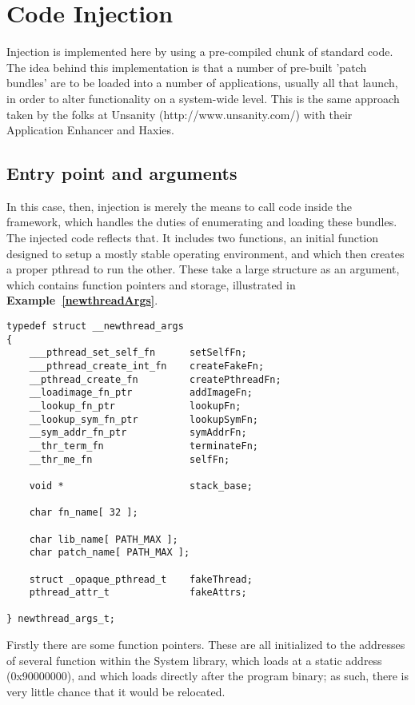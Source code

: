 \documentclass[english]{article}
\begin{document}
\section{Code Injection}

Injection is implemented here by using a pre-compiled chunk of standard code. The idea behind this implementation is that a number of pre-built 'patch bundles' are to be loaded into a number of applications, usually all that launch, in order to alter functionality on a system-wide level. This is the same approach taken by the folks at Unsanity (http://www.unsanity.com/) with their Application Enhancer and Haxies.

\subsection{Entry point and arguments}
In this case, then, injection is merely the means to call code inside the framework, which handles the duties of enumerating and loading these bundles. The injected code reflects that. It includes two functions, an initial function designed to setup a mostly stable operating environment, and which then creates a proper pthread to run the other. These take a large structure as an argument, which contains function pointers and storage, illustrated in \textbf{Example~\ref{newthreadArgs}}.

\begin{lstlisting}[label=newthreadArgs, caption=Injected code parameter block.]
typedef struct __newthread_args
{
    ___pthread_set_self_fn      setSelfFn;
    ___pthread_create_int_fn    createFakeFn;
    __pthread_create_fn         createPthreadFn;
    __loadimage_fn_ptr          addImageFn;
    __lookup_fn_ptr             lookupFn;
    __lookup_sym_fn_ptr         lookupSymFn;
    __sym_addr_fn_ptr           symAddrFn;
    __thr_term_fn               terminateFn;
    __thr_me_fn                 selfFn;

    void *                      stack_base;

    char fn_name[ 32 ];

    char lib_name[ PATH_MAX ];
    char patch_name[ PATH_MAX ];

    struct _opaque_pthread_t    fakeThread;
    pthread_attr_t              fakeAttrs;

} newthread_args_t;
\end{lstlisting}

Firstly there are some function pointers. These are all initialized to the addresses of several function within the System library, which loads at a static address (0x90000000), and which loads directly after the program binary; as such, there is very little chance that it would be relocated.
\end{document}
